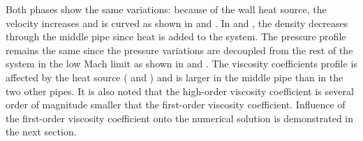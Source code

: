 %
Both phases show the same variations: because of the wall heat source, the velocity increases and is curved as shown in  and . In  and , the density decreases through the middle pipe since heat is added to the system. The pressure profile remains the same since the pressure variations are decoupled from the rest of the system in the low Mach limit as shown in  and . The viscosity coefficients profile is affected by the heat source ( and ) and is larger in the middle pipe than in the two other pipes. It is also noted that the high-order viscosity coefficient is several order of magnitude smaller that the first-order viscosity coefficient. Influence of the first-order viscosity coefficient onto the numerical solution is demonstrated in the next section.

